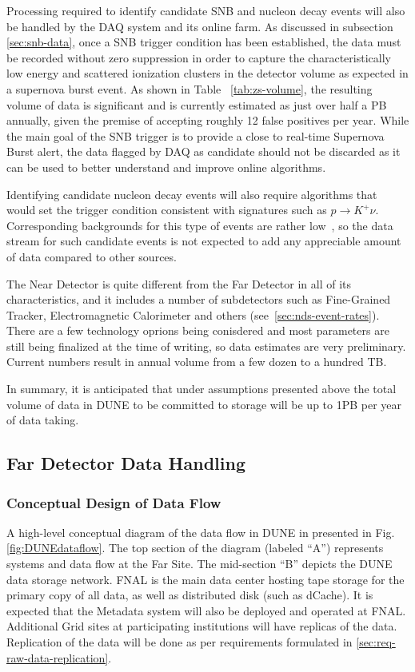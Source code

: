 Processing required to identify candidate SNB and nucleon decay events will also be handled by the DAQ system and its online farm.
As discussed in subsection \ref{sec:snb-data}, once a SNB trigger condition has been established, the data must
be recorded without zero suppression in order to capture the characteristically low energy and scattered ionization
clusters in the detector volume as expected in a supernova burst event. As shown in Table~ \ref{tab:zs-volume}, the resulting
volume of data is significant and is currently estimated as just over half a PB annually, given the premise of accepting roughly
12 false positives per year. While the main goal of the SNB trigger is to provide a close to real-time Supernova Burst alert, the data
flagged by DAQ as candidate should not be discarded as it can be used to better understand and improve online algorithms.

Identifying candidate nucleon decay events will also require algorithms that would set the trigger condition consistent
with signatures such as $p \rightarrow K^+\nu$. Corresponding backgrounds for this type of events are rather low~\cite{muon_bkgd_pdk},
so the data stream for such candidate events is not expected to add any appreciable amount of data compared to other sources.

The Near Detector is quite different from the Far Detector in all of its characteristics, and it includes a number of subdetectors such as
Fine-Grained Tracker, Electromagnetic Calorimeter and others (see~\ref{sec:nds-event-rates}). There are a few technology oprions
being conisdered and most parameters are still being finalized at the time of writing, so data estimates are very preliminary.
Current numbers result in annual volume from a few dozen to a hundred TB.

In summary, it is anticipated that under assumptions presented above the total volume of data in DUNE to be
committed to storage will be up to 1PB per year of data taking.

\subsection{Far Detector Data Handling}
\subsubsection{Conceptual Design of Data Flow}
A high-level conceptual diagram of the data flow in DUNE in presented in Fig.\ref{fig:DUNEdataflow}.
The top section of the diagram (labeled ``A'') represents systems and data flow at the Far Site.
The mid-section ``B'' depicts the DUNE data storage network. FNAL is the main data center
hosting tape storage for the primary copy of all data, as well as distributed disk (such as dCache).
It is expected that the Metadata system will also be deployed and operated at FNAL.
Additional Grid sites at participating institutions will have replicas of the data.
Replication of the data will be done as per requirements formulated in \ref{sec:req-raw-data-replication}.

